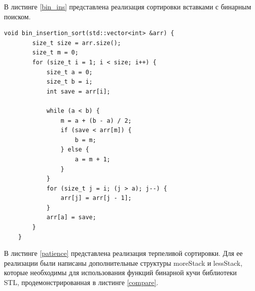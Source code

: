 \documentclass[a4paper, 14pt]{article}
\begin{document}
	В листинге \ref{bin_ins} представлена реализация сортировки вставками с бинарным поиском.
	
	\begin{lstlisting}[label= bin_ins,caption=Сортировка вставками с бинарным поиском]
   void bin_insertion_sort(std::vector<int> &arr) {
        size_t size = arr.size();
        size_t m = 0;
        for (size_t i = 1; i < size; i++) {
            size_t a = 0;
            size_t b = i;
            int save = arr[i];
    
            while (a < b) {
                m = a + (b - a) / 2;
                if (save < arr[m]) {
                    b = m;
                } else {
                    a = m + 1;
                }
            }
            for (size_t j = i; (j > a); j--) {
                arr[j] = arr[j - 1];
            }
            arr[a] = save;
        }
    }
	\end{lstlisting}
	
	
	\newpage
	В листинге \ref{patience} представлена реализация терпеливой сортировки. Для ее реализации были написаны дополнительные структуры moreStack и lessStack, которые необходимы для использования функций бинарной кучи библиотеки STL, продемонстрированная в листинге \ref{compare}.
	
\end{document}
